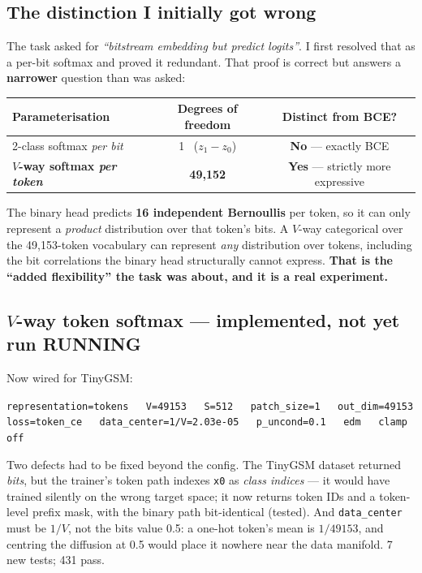 \documentclass[10pt,a4paper]{article}
\newcommand{\code}[1]{\texttt{\small #1}}
\newcommand{\run}{\textcolor{orange!85!black}{\textbf{RUNNING}}}
\begin{document}
\subsection*{The distinction I initially got wrong}
The task asked for \emph{``bitstream embedding but predict logits''}. I first
resolved that as a per-bit softmax and proved it redundant. That proof is
correct but answers a \textbf{narrower} question than was asked:

\begin{center}\small
\begin{tabular}{@{}lcc@{}}
\toprule
Parameterisation & Degrees of freedom & Distinct from BCE?\\ \midrule
2-class softmax \emph{per bit} & 1 \ ($z_1-z_0$) & \textbf{No} --- exactly BCE\\
\textbf{$V$-way softmax \emph{per token}} & \textbf{49{,}152} & \textbf{Yes} --- strictly more expressive\\
\bottomrule
\end{tabular}
\end{center}

The binary head predicts \textbf{16 independent Bernoullis} per token, so it can
only represent a \emph{product} distribution over that token's bits. A $V$-way
categorical over the 49{,}153-token vocabulary can represent \emph{any}
distribution over tokens, including the bit correlations the binary head
structurally cannot express. \textbf{That is the ``added flexibility'' the task
was about, and it is a real experiment.}

\subsection*{$V$-way token softmax --- implemented, not yet run \run}
Now wired for TinyGSM:
\begin{center}\small
\code{representation=tokens \ \ V=49153 \ \ S=512 \ \ patch\_size=1 \ \ out\_dim=49153}\\
\code{loss=token\_ce \ \ data\_center=1/V=2.03e-05 \ \ p\_uncond=0.1 \ \ edm \ \ clamp off}
\end{center}
Two defects had to be fixed beyond the config. The TinyGSM dataset returned
\emph{bits}, but the trainer's token path indexes \code{x0} as \emph{class
indices} --- it would have trained silently on the wrong target space; it now
returns token IDs and a token-level prefix mask, with the binary path
bit-identical (tested). And \code{data\_center} must be $1/V$, not the bits
value 0.5: a one-hot token's mean is $1/49153$, and centring the diffusion at
0.5 would place it nowhere near the data manifold. 7 new tests; 431 pass.
\end{document}
